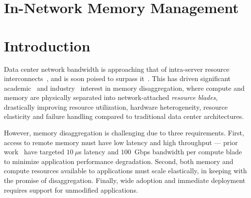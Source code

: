\section{In-Network Memory Management}


\vspace{-0.5em}
\section{Introduction}
\label{sec:mindintro}

Data center network bandwidth is approaching that of intra-server resource interconnects~\cite{terabitethernet, remotememory}, and is soon poised to surpass it~\cite{legoosatc}. This has driven significant academic~\cite{memdisagg2, memdisagg3, memdisagg4, memdisagg5, memdisagg6, memdisagg1, legoos, infiniswap, fastswap, disagg, disaggfault} and industry~\cite{industry0, industry1, industry2, industry3, industry4, industry5} interest in memory disaggregation, where compute and memory are physically separated into network-attached \textit{resource blades}, drastically improving resource utilization, hardware heterogeneity, resource elasticity and failure handling compared to traditional data center architectures. 

However, memory disaggregation is challenging due to three requirements. First,  access to remote memory must have low latency and high throughput --- prior work~\cite{legoos, infiniswap, fastswap, disagg} have targeted $10~\mu$s latency and $100$~Gbps bandwidth per compute blade to minimize application performance degradation. Second,  both memory and compute resources available to applications must scale elastically, in keeping with the promise of disaggregation. Finally, wide adoption and immediate deployment requires support for unmodified applications.


